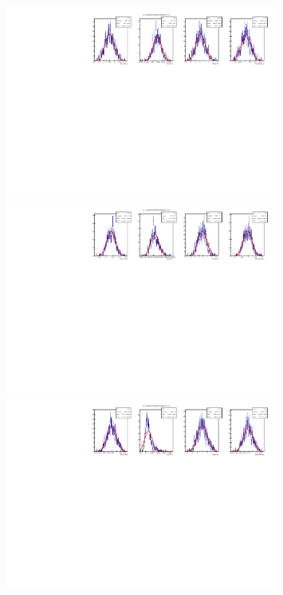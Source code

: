 \begin{figure}[t]
  \begin{center}
    \includegraphics[width=0.8\textwidth]{AA-Appdx-mcbootstrap/figs/1DPullPlot_dp_0_RLogisticCalibration_MCTruth_Bu2D0Pi_OS_20171114_SSbarAccAsymmFTFloatDMGammaConstrAllSamples.pdf} \\
    \includegraphics[width=0.8\textwidth]{AA-Appdx-mcbootstrap/figs/1DPullPlot_dp_1_RLogisticCalibration_MCTruth_Bu2D0Pi_OS_20171114_SSbarAccAsymmFTFloatDMGammaConstrAllSamples.pdf} \\
    \includegraphics[width=0.8\textwidth]{AA-Appdx-mcbootstrap/figs/1DPullPlot_dp_2_RLogisticCalibration_MCTruth_Bu2D0Pi_OS_20171114_SSbarAccAsymmFTFloatDMGammaConstrAllSamples.pdf} \\

\end{center}
\end{figure}

